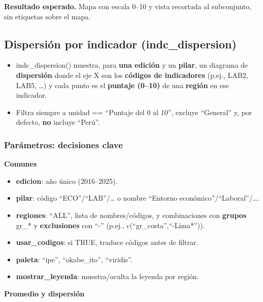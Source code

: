 \documentclass[
  11pt,
  letterpaper,
  DIV=11,
  numbers=noendperiod]{scrartcl}
\begin{document}
\textbf{Resultado esperado.} Mapa con escala 0--10 y vista recortada al
subconjunto, sin etiquetas sobre el mapa.

\subsection{\texorpdfstring{\textbf{Dispersión por indicador
(indc\_dispersion)}}{Dispersión por indicador (indc\_dispersion)}}\label{dispersiuxf3n-por-indicador-indc_dispersion}

\begin{itemize}
\item
  indc\_dispersion() muestra, para \textbf{una edición} y un
  \textbf{pilar}, un diagrama de \textbf{dispersión} donde el eje X son
  los \textbf{códigos de indicadores} (p.ej., LAB2, LAB5, \ldots) y cada
  punto es el \textbf{puntaje (0--10)} de una \textbf{región} en ese
  indicador.
\item
  Filtra siempre a unidad == ``Puntaje del 0 al 10'', excluye
  ``General'' y, por defecto, \textbf{no} incluye ``Perú''.
\end{itemize}

\subsubsection{\texorpdfstring{\textbf{Parámetros: decisiones
clave}}{Parámetros: decisiones clave}}\label{paruxe1metros-decisiones-clave-2}

\textbf{Comunes}

\begin{itemize}
\item
  \textbf{edicion}: año único (2016--2025).
\item
  \textbf{pilar}: código ``ECO''/``LAB''/\ldots{} o nombre ``Entorno
  económico''/``Laboral''/\ldots.
\item
  \textbf{regiones}: ``ALL'', lista de nombres/códigos, y combinaciones
  con \textbf{grupos} gr\_* y \textbf{exclusiones} con ``-'' (p.ej.,
  c(``gr\_costa'',``-Lima*'')).
\item
  \textbf{usar\_codigos}: si TRUE, traduce códigos antes de filtrar.
\item
  \textbf{paleta}: ``ipe'', ``okabe\_ito'', ``viridis''.
\item
  \textbf{mostrar\_leyenda}: muestra/oculta la leyenda por región.
\end{itemize}

\textbf{Promedio y dispersión}
\end{document}
